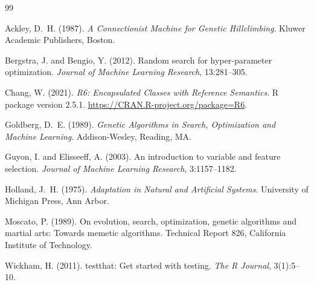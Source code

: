 \documentclass[11pt,a4paper]{article}
\begin{document}

\begin{thebibliography}{99}

Ackley, D.~H. (1987).
\newblock \emph{A Connectionist Machine for Genetic Hillclimbing}.
\newblock Kluwer Academic Publishers, Boston.

Bergstra, J. and Bengio, Y. (2012).
\newblock Random search for hyper-parameter optimization.
\newblock \emph{Journal of Machine Learning Research}, 13:281--305.

Chang, W. (2021).
\newblock \emph{R6: Encapsulated Classes with Reference Semantics}.
\newblock R package version 2.5.1.
\newblock \url{https://CRAN.R-project.org/package=R6}.

Goldberg, D.~E. (1989).
\newblock \emph{Genetic Algorithms in Search, Optimization and Machine
  Learning}.
\newblock Addison-Wesley, Reading, MA.

Guyon, I. and Elisseeff, A. (2003).
\newblock An introduction to variable and feature selection.
\newblock \emph{Journal of Machine Learning Research}, 3:1157--1182.

Holland, J.~H. (1975).
\newblock \emph{Adaptation in Natural and Artificial Systems}.
\newblock University of Michigan Press, Ann Arbor.

Moscato, P. (1989).
\newblock On evolution, search, optimization, genetic algorithms and martial
  arts: Towards memetic algorithms.
\newblock Technical Report 826, California Institute of Technology.

Wickham, H. (2011).
\newblock testthat: Get started with testing.
\newblock \emph{The R Journal}, 3(1):5--10.

\end{thebibliography}
\end{document}
